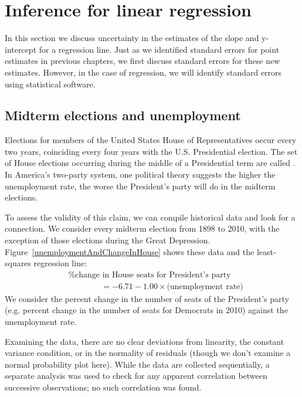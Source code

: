 \section[Inference for linear regression]{Inference for linear regression ~}
\label{inferenceForLinearRegression}

In this section we discuss uncertainty in the estimates of the slope and y-intercept for a regression line. Just as we identified standard errors for point estimates in previous chapters, we first discuss standard errors for these new estimates. However, in the case of regression, we will identify standard errors using statistical software.

\subsection{Midterm elections and unemployment}


Elections for members of the United States House of Representatives occur every two years, coinciding every four years with the U.S. Presidential election. The set of House elections occurring during the middle of a Presidential term are called . In America's two-party system, one political theory suggests the higher the unemployment rate, the worse the President's party will do in the midterm elections.

To assess the validity of this claim, we can compile historical data and look for a connection. We consider every midterm election from 1898 to 2010, with the exception of those elections during the Great Depression. Figure~\ref{unemploymentAndChangeInHouse} shows these data and the least-squares regression line: \vspace{-2mm}
\begin{align*}
&\text{\% change in House seats for President's party}  \\
&\qquad\qquad= -6.71 - 1.00\times \text{(unemployment rate)}
\end{align*}
We consider the percent change in the number of seats of the President's party (e.g. percent change in the number of seats for Democrats in 2010) against the unemployment rate.

Examining the data, there are no clear deviations from linearity, the constant variance condition, or in the normality of residuals (though we don't examine a normal probability plot here). While the data are collected sequentially, a separate analysis was used to check for any apparent correlation between successive observations; no such correlation was found.

